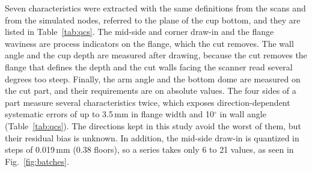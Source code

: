 \documentclass[pdflatex,sn-basic,lineno]{sn-jnl}
\begin{document}
Seven characteristics were extracted with the same definitions from the scans and from the simulated nodes, referred to the plane of the cup bottom, and they are listed in Table~\ref{tab:qcs}. The mid-side and corner draw-in and the flange waviness are process indicators on the flange, which the cut removes. The wall angle and the cup depth are measured after drawing, because the cut removes the flange that defines the depth and the cut walls facing the scanner read several degrees too steep. Finally, the arm angle and the bottom dome are measured on the cut part, and their requirements are on absolute values. The four sides of a part measure several characteristics twice, which exposes direction-dependent systematic errors of up to 3.5\,mm in flange width and 10$^\circ$ in wall angle (Table~\ref{tab:qcs}). The directions kept in this study avoid the worst of them, but their residual bias is unknown. In addition, the mid-side draw-in is quantized in steps of 0.019\,mm (0.38 floors), so a series takes only 6 to 21 values, as seen in Fig.~\ref{fig:batches}.
\end{document}
